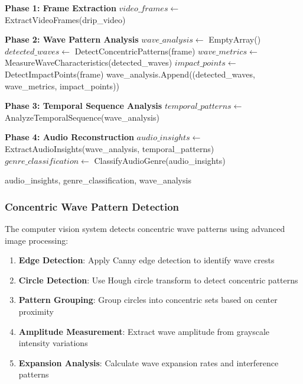 \begin{algorithm}[H]
\caption{Computer Vision Drip Pattern Analysis}
\begin{algorithmic}[1]
    \State \textbf{Phase 1: Frame Extraction}
    \State $video\_frames \gets$ ExtractVideoFrames(drip\_video)
    
    \State \textbf{Phase 2: Wave Pattern Analysis}
    \State $wave\_analysis \gets$ EmptyArray()
        \State $detected\_waves \gets$ DetectConcentricPatterns(frame)
        \State $wave\_metrics \gets$ MeasureWaveCharacteristics(detected\_waves)
        \State $impact\_points \gets$ DetectImpactPoints(frame)
        \State wave\_analysis.Append((detected\_waves, wave\_metrics, impact\_points))
    \EndFor
    
    \State \textbf{Phase 3: Temporal Sequence Analysis}
    \State $temporal\_patterns \gets$ AnalyzeTemporalSequence(wave\_analysis)
    
    \State \textbf{Phase 4: Audio Reconstruction}
    \State $audio\_insights \gets$ ExtractAudioInsights(wave\_analysis, temporal\_patterns)
    \State $genre\_classification \gets$ ClassifyAudioGenre(audio\_insights)
    
    \State \Return audio\_insights, genre\_classification, wave\_analysis
\EndProcedure
\end{algorithmic}
\end{algorithm}

\subsubsection{Concentric Wave Pattern Detection}

The computer vision system detects concentric wave patterns using advanced image processing:

\begin{enumerate}
\item \textbf{Edge Detection}: Apply Canny edge detection to identify wave crests
\item \textbf{Circle Detection}: Use Hough circle transform to detect concentric patterns
\item \textbf{Pattern Grouping}: Group circles into concentric sets based on center proximity
\item \textbf{Amplitude Measurement}: Extract wave amplitude from grayscale intensity variations
\item \textbf{Expansion Analysis}: Calculate wave expansion rates and interference patterns
\end{enumerate}

